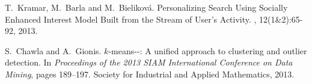 \documentclass[sigconf,anonymous]{acmart}
\theoremstyle{definition}
\begin{document}
\begin{thebibliography}{10}
T.~Kramar, M.~Barla and M.~Bielikov{\'a}.
\newblock Personalizing Search Using Socially Enhanced Interest Model Built from the Stream of User's Activity. 
, 12(1\&2):65-92, 2013.

S.~Chawla and A.~Gionis.
\newblock $k$-means{-}{-}: A unified approach to clustering and outlier detection.
\newblock In {\em Proceedings of the 2013 SIAM International Conference on Data Mining}, pages 189--197. Society for Industrial and Applied Mathematics, 2013.

\end{thebibliography}
\end{document}
